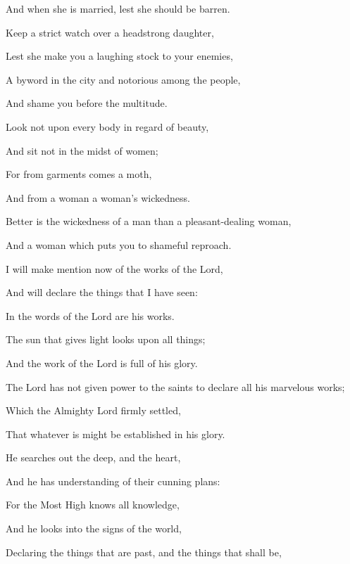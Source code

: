 {\par }{\Q And when she is married, lest she should be barren.
\par }{\Q {}Keep a strict watch over a headstrong daughter,
\par }{\Q Lest she make you
 a laughing stock to your enemies,
\par }{\Q A byword in the city and
 notorious among the people,
\par }{\Q And shame you before the multitude.
\par }{\BB \par }{\Q {}Look not upon every body in regard of beauty,
\par }{\Q And sit not in the midst of women;
\par }{\Q {}For from garments comes a moth,
\par }{\Q And from a woman a woman’s wickedness.
\par }{\Q {}Better is the wickedness of a man than a pleasant-dealing woman,
\par }{\Q And a woman which puts you to shameful reproach.
\par }{\BB \par }{\Q {}I will make mention now of the works of the Lord,
\par }{\Q And will declare the things that I have seen:
\par }{\Q In the words of the Lord are his works.
\par }{\Q {}The sun that gives light looks upon all things;
\par }{\Q And the work of the Lord is full of his glory.
\par }{\Q {}The Lord has not given power to the saints to declare all his marvelous works;
\par }{\Q Which the Almighty Lord firmly settled,
\par }{\Q That whatever is might be established in his glory.
\par }{\Q {}He searches out the deep, and the heart,
\par }{\Q And he has understanding of their cunning plans:
\par }{\Q For the Most High knows all knowledge,
\par }{\Q And he looks into the
 signs of the world,
\par }{\Q {}Declaring the things that are past, and the things that shall be,
}
